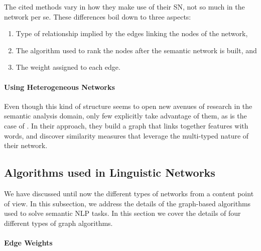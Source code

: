 The cited methods vary in how they make use of their SN, not so much in the network per se. These differences boil down to three aspects:
\begin{enumerate}
\item Type of relationship implied by the edges linking the nodes of the network, 
\item The algorithm used to rank the nodes after the semantic network is built, and
\item The weight assigned to each edge.
\end{enumerate}

\paragraph{Using Heterogeneous Networks}

Even though this kind of structure seems to open new avenues of research in the semantic analysis domain, only few explicitly take advantage of them, as is the case of \cite{2013.Saluja.Graph-BasedUnsupervisedLearning}. In their approach, they build a graph that links together features with words, and discover similarity measures that leverage the multi-typed nature of their network.


\subsection{Algorithms used in Linguistic Networks}

We have discussed until now the different types of networks from a content point of view. In this subsection, we address the details of the graph-based algorithms used to solve semantic NLP tasks. In this section we cover the details of four different types of graph algorithms.



\paragraph{Edge Weights}

